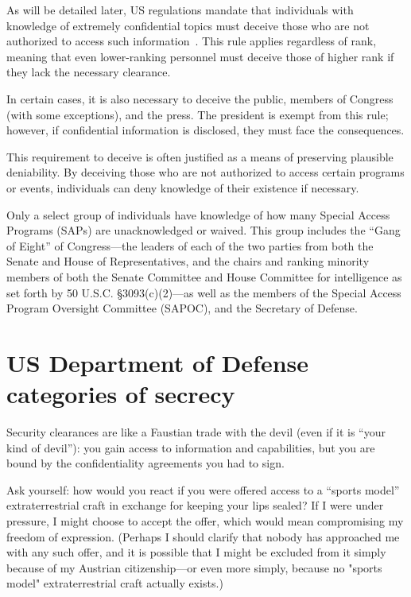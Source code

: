 As will be detailed later, US regulations mandate that individuals with knowledge of extremely confidential topics must deceive
those who are not authorized to access such information~\cite{vanderReijden2005,Sweetman2000,Dolan-MrX-Disclosure2020Jul}.
This rule applies regardless of rank, meaning that even lower-ranking personnel must deceive those of higher rank if they lack the necessary clearance.

In certain cases, it is also necessary to deceive the public, members of Congress (with some exceptions), and the press.
The president is exempt from this rule; however, if confidential information is disclosed, they must face the consequences.

This requirement to deceive is often justified as a means of preserving plausible deniability.
By deceiving those who are not authorized to access certain programs or events, individuals can deny knowledge of their existence if necessary.

Only a select group of individuals have knowledge of how many Special Access Programs (SAPs) are unacknowledged or waived.
This group includes the ``Gang of Eight'' of Congress---the leaders of each of the two parties from both the Senate and House of Representatives,
and the chairs and ranking minority members of
both the Senate Committee and House Committee for intelligence as set forth by 50 U.S.C. \S 3093(c)(2)---as well as the members of the Special Access Program Oversight Committee (SAPOC), and the Secretary of Defense.

\section{US Department of Defense categories of secrecy}\label{2023-UFO-part-Perception-crash-retreivals-USDOFCOS}

Security clearances are like a Faustian trade with the devil (even if it is ``your kind of devil''): you gain access to information and capabilities, but you are bound by the confidentiality agreements you had to sign.

Ask yourself: how would you react if you were offered access to a ``sports model'' extraterrestrial craft
in exchange for keeping your lips sealed? If I were under pressure,
I might choose to accept the offer, which would mean compromising my freedom of expression.
(Perhaps I should clarify that nobody has approached me with any such offer, and it is possible that I might be excluded from it simply because of my Austrian citizenship---or even more simply, because no "sports model" extraterrestrial craft actually exists.)

